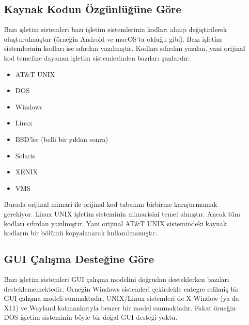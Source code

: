 \documentclass[a4paper,10pt,turkish]{sphinxmanual}
\begin{document}
\subsection{Kaynak Kodun Özgünlüğüne Göre}
\label{\detokenize{introduction:kaynak-kodun-ozgunlugune-gore}}
\sphinxAtStartPar
Bazı işletim sistemleri bazı işletim sistemlerinin kodları alınıp değiştirilerek
oluşturulmuştur (örneğin Android ve macOS’ta olduğu gibi). Bazı işletim sistemlerinin
kodları ise sıfırdan yazılmıştır. Kodları sıfırdan yazılan, yani orijinal kod temeline
dayanan işletim sistemlerinden bazıları şunlardır:
\begin{itemize}
\item {} 
\sphinxAtStartPar
AT\&T UNIX

\item {} 
\sphinxAtStartPar
DOS

\item {} 
\sphinxAtStartPar
Windows

\item {} 
\sphinxAtStartPar
Linux

\item {} 
\sphinxAtStartPar
BSD’ler (belli bir yıldan sonra)

\item {} 
\sphinxAtStartPar
Solaris

\item {} 
\sphinxAtStartPar
XENIX

\item {} 
\sphinxAtStartPar
VMS

\end{itemize}

\sphinxAtStartPar
Burada orijinal mimari ile orijinal kod tabanını birbirine karıştırmamak gerekiyor. Linux
UNIX işletim sisteminin mimarisini temel almıştır. Ancak tüm kodları sıfırdan yazılmıştır.
Yani orijinal AT\&T UNIX sistemindeki kaynak kodların bir bölümü kopyalanarak
kullanılmamıştır.


\subsection{GUI Çalışma Desteğine Göre}
\label{\detokenize{introduction:gui-calisma-destegine-gore}}
\sphinxAtStartPar
Bazı işletim sistemleri GUI çalışma modelini doğrudan desteklerken bazıları
desteklememektedir. Örneğin Windows sistemleri çekirdekle entegre edilmiş bir GUI çalışma
modeli sunmaktadır. UNIX/Linux sistemleri de X Window (ya da X11) ve Wayland katmanlarıyla
benzer bir model sunmaktadır. Fakat örneğin DOS işletim sisteminin böyle bir doğal GUI
desteği yoktu.
\end{document}
